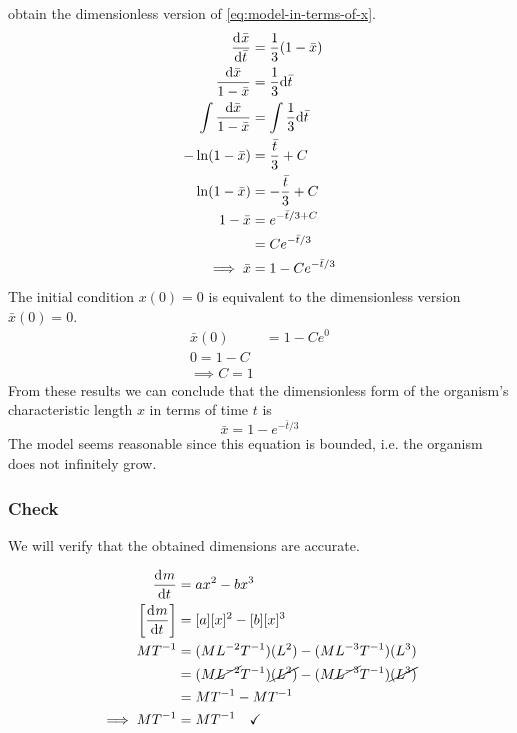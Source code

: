\documentclass[12pt]{article}
\begin{document}
obtain the dimensionless version of \cref{eq:model-in-terms-of-x}.
\begin{equation}
  \label{eq:dimensionless-model-for-x-bar}
  \begin{aligned}
    \frac{\mathrm{d}^{} {\bar{x}}}{\mathrm{d}{\bar{t}}^{}} &= \frac{1}{3}(1-\bar{x}) \\
    \frac{\mathrm{d}{\bar{x}}}{1-\bar{x}} &= \frac{1}{3} \mathrm{d}{\bar{t}} \\
    \int \frac{\mathrm{d}{\bar{x}}}{1-\bar{x}} &= \int \frac{1}{3} \mathrm{d}{\bar{t}} \\
    -\ln (1-\bar{x}) &= \frac{\bar{t}}{3} + C \\
    \ln (1-\bar{x}) &= -\frac{\bar{t}}{3} + C \\
    1-\bar{x} &= e^{-\bar{t}/3+C} \\
    &= Ce^{-\bar{t}/3} \\
    \implies \bar{x} &= 1-Ce^{-\bar{t}/3}
  \end{aligned}
\end{equation}
The initial condition $x(0)=0$ is equivalent to the dimensionless version
$\bar{x}(0)=0$.
\begin{equation}
  \label{eq:dimensionless-model-for-x-bar-for-c}
  \begin{aligned}
    \bar{x}(0) &= 1-Ce^{0} \\
    0 = 1-C \\
    \implies C = 1
  \end{aligned}
\end{equation}
From these results we can conclude that the dimensionless form of the organism's
characteristic length $x$ in terms of time $t$ is
\begin{equation} \boxed{
    \bar{x} = 1-e^{-\bar{t}/3}
  }
\end{equation}
The model seems reasonable since this equation is bounded, i.e. the organism
does not infinitely grow.

\subsubsection*{Check}
We will verify that the obtained dimensions are accurate.

\begin{equation}
  \begin{aligned}
    \frac{\mathrm{d}^{} {m}}{\mathrm{d}{t}^{}} &= ax^2 - bx^3 \\
    \left[\frac{\mathrm{d}^{} {m}}{\mathrm{d}{t}^{}}\right] &= [a][x]^2 - [b][x]^3 \\
    MT^{-1} &= (ML^{-2}T^{-1})(L^2) - (ML^{-3}T^{-1})(L^3) \\
    &= (M\cancel{L^{-2}}T^{-1})\cancel{(L^2)} - (M\cancel{L^{-3}}T^{-1})\cancel{(L^3)} \\
    &= MT^{-1} - MT^{-1} \\
    \implies MT^{-1} &= MT^{-1} \quad\checkmark
  \end{aligned}
\end{equation}
\end{document}
